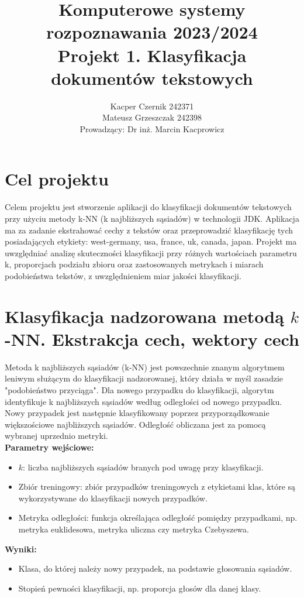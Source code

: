 \documentclass{article}
\author{
	{Kacper Czernik 242371} \\
	{Mateusz Grzeszczak 242398}\\ 
{Prowadzący: Dr inż. Marcin Kacprowicz }
}
\title{Komputerowe systemy rozpoznawania 2023/2024\\Projekt 1. Klasyfikacja dokumentów tekstowych}
\begin{document}
\maketitle

\section{Cel projektu}
Celem projektu jest stworzenie aplikacji do klasyfikacji dokumentów tekstowych przy użyciu metody k-NN (k najbliższych sąsiadów) w technologii JDK. Aplikacja ma za zadanie ekstrahować cechy z tekstów oraz przeprowadzić klasyfikację tych posiadających etykiety: west-germany, usa, france, uk, canada, japan. Projekt ma uwzględniać analizę skuteczności klasyfikacji przy różnych wartościach parametru k, proporcjach podziału zbioru oraz zastosowanych metrykach i miarach podobieństwa tekstów, z uwzględnieniem miar jakości klasyfikacji.


\section{Klasyfikacja nadzorowana metodą $k$-NN.  Ekstrakcja cech, wektory cech}
Metoda k najbliższych sąsiadów (k-NN) jest powszechnie znanym algorytmem leniwym służącym do klasyfikacji nadzorowanej, który działa w myśl zasadzie "podobieństwo przyciąga". Dla nowego przypadku do klasyfikacji, algorytm identyfikuje k najbliższych sąsiadów według odległości od nowego przypadku. Nowy przypadek jest następnie klasyfikowany poprzez przyporządkowanie większościowe najbliższych sąsiadów. Odległość obliczana jest za pomocą wybranej uprzednio metryki.\\

\textbf{Parametry wejściowe:}
\begin{itemize}
    \item $k$: liczba najbliższych sąsiadów branych pod uwagę przy klasyfikacji.
    \item Zbiór treningowy: zbiór przypadków treningowych z etykietami klas, które są wykorzystywane do klasyfikacji nowych przypadków.
    \item Metryka odległości: funkcja określająca odległość pomiędzy przypadkami, np. metryka euklidesowa, metryka uliczna czy metryka Czebyszewa.
\end{itemize}

\textbf{Wyniki:}
\begin{itemize}
    \item Klasa, do której należy nowy przypadek, na podstawie głosowania sąsiadów.
    \item Stopień pewności klasyfikacji, np. proporcja głosów dla danej klasy.
\end{itemize}
\end{document}
